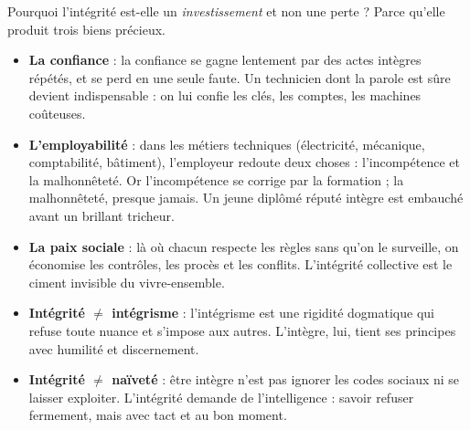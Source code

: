 \documentclass[11pt]{article}
\begin{document}
Pourquoi l'intégrité est-elle un \emph{investissement} et non une perte ? Parce qu'elle produit trois biens précieux.

\begin{itemize}
\item \textbf{La confiance} : la confiance se gagne lentement par des actes intègres répétés, et se perd en une seule faute. Un technicien dont la parole est sûre devient indispensable : on lui confie les clés, les comptes, les machines coûteuses.
\item \textbf{L'employabilité} : dans les métiers techniques (électricité, mécanique, comptabilité, bâtiment), l'employeur redoute deux choses : l'incompétence et la malhonnêteté. Or l'incompétence se corrige par la formation ; la malhonnêteté, presque jamais. Un jeune diplômé réputé intègre est embauché avant un brillant tricheur.
\item \textbf{La paix sociale} : là où chacun respecte les règles sans qu'on le surveille, on économise les contrôles, les procès et les conflits. L'intégrité collective est le ciment invisible du vivre-ensemble.
\end{itemize}

\begin{attention}
\begin{itemize}
\item \textbf{Intégrité $\neq$ intégrisme} : l'intégrisme est une rigidité dogmatique qui refuse toute nuance et s'impose aux autres. L'intègre, lui, tient ses principes avec humilité et discernement.
\item \textbf{Intégrité $\neq$ naïveté} : être intègre n'est pas ignorer les codes sociaux ni se laisser exploiter. L'intégrité demande de l'intelligence : savoir refuser fermement, mais avec tact et au bon moment.
\end{itemize}
\end{attention}
\end{document}
